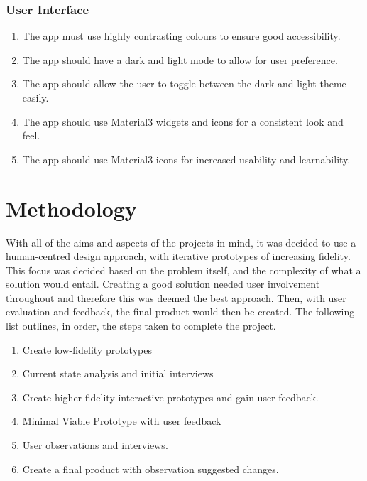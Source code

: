 \documentclass [11pt,a4paper]{article}
\begin{document}
\subsubsection{User Interface}
\label{sec:spec_ui}
\begin{enumerate}[label={\fbox{INTF\_SPEC\_\arabic*}}, leftmargin=*, labelindent=\parindent]
    \item The app must use highly contrasting colours to ensure good accessibility. \label{spec_ui_1}
    \item The app should have a dark and light mode to allow for user preference. \label{spec_ui_2}
    \item The app should allow the user to toggle between the dark and light theme easily.  \label{spec_ui_3}
    \item The app should use Material3 widgets and icons for a consistent look and feel. \label{spec_ui_4}
    \item The app should use Material3 icons for increased usability and learnability. \label{spec_ui_5}
\end{enumerate}

\section{Methodology}
\label{sec:methodology}

With all of the aims and aspects of the projects in mind, it was decided to use a human-centred design approach, with iterative prototypes of increasing fidelity. This focus was decided based on the problem itself, and the complexity of what a solution would entail. Creating a good solution needed user involvement throughout and therefore this was deemed the best approach. Then, with user evaluation and feedback, the final product would then be created. The following list outlines, in order, the steps taken to complete the project.

\begin{enumerate}[noitemsep]
    \item Create low-fidelity prototypes
    \item Current state analysis and initial interviews
    \item Create higher fidelity interactive prototypes and gain user feedback.
    \item Minimal Viable Prototype with user feedback
    \item User observations and interviews.
    \item Create a final product with observation suggested changes.
\end{enumerate}
\end{document}
